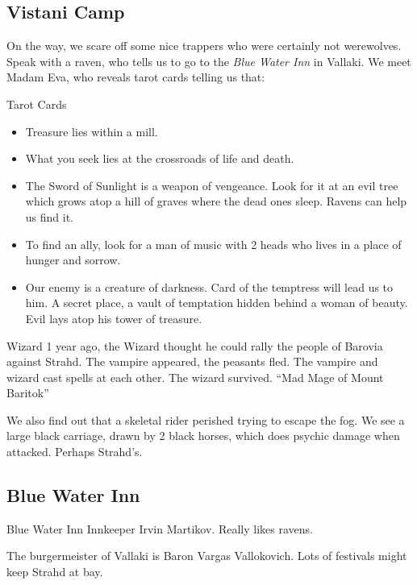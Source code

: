 \documentclass[10pt,twoside,twocolumn]{article}
\begin{document}
\subsection{Vistani Camp}
On the way, we scare off some nice trappers who were certainly not werewolves. Speak with a raven, who tells us to go to the \emph{Blue Water Inn} in Vallaki. We meet Madam Eva, who reveals tarot cards telling us that:
\begin{paperbox}{Tarot Cards}
  \begin{itemize}
  \item Treasure lies within a mill.
  \item What you seek lies at the crossroads of life and death.
  \item The Sword of Sunlight is a weapon of vengeance. Look for it at an evil tree which grows atop a hill of graves where the dead ones sleep. Ravens can help us find it.
  \item To find an ally, look for a man of music with 2 heads who lives in a place of hunger and sorrow.
  \item Our enemy is a creature of darkness. Card of the temptress will lead us to him. A secret place, a vault of temptation hidden behind a woman of beauty. Evil lays atop his tower of treasure.
  \end{itemize}
\end{paperbox}
\begin{paperbox}{Wizard}
  1 year ago, the Wizard thought he could rally the people of Barovia against Strahd. The vampire appeared, the peasants fled. The vampire and wizard cast spells at each other. The wizard survived. ``Mad Mage of Mount Baritok''
\end{paperbox}
We also find out that a skeletal rider perished trying to escape the fog. We see a large black carriage, drawn by 2 black horses, which does psychic damage when attacked. Perhaps Strahd's.
\subsection{Blue Water Inn}
\begin{commentbox}{Blue Water Inn}
  Innkeeper Irvin Martikov. Really likes ravens.
\end{commentbox}
The burgermeister of Vallaki is Baron Vargas Vallokovich. Lots of festivals might keep Strahd at bay.
\end{document}
